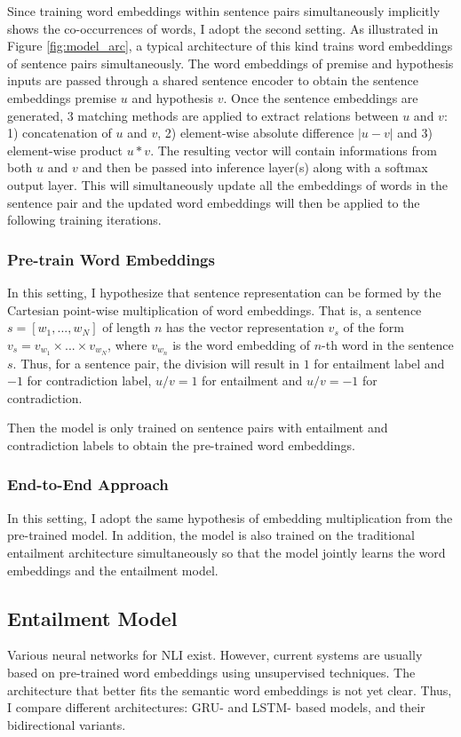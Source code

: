 \documentclass[10pt,twocolumn,letterpaper]{article}
\begin{document}
Since training word embeddings within sentence pairs simultaneously implicitly shows the co-occurrences of words, I adopt the second setting. As illustrated in Figure \ref{fig:model_arc}, a typical architecture of this kind trains word embeddings of sentence pairs simultaneously. The word embeddings of premise and hypothesis inputs are passed through a shared sentence encoder to obtain the sentence embeddings premise $u$ and hypothesis $v$. Once the sentence embeddings are generated, 3 matching methods are applied to extract relations between $u$ and $v$: 1) concatenation of $u$ and $v$, 2) element-wise absolute difference $|u - v|$ and 3) element-wise product $u*v$. The resulting vector will contain informations from both $u$ and $v$ and then be passed into inference layer(s) along with a softmax output layer. This will simultaneously update all the embeddings of words in the sentence pair and the updated word embeddings will then be applied to the following training iterations.

\subsubsection{Pre-train Word Embeddings}
In this setting, I hypothesize that sentence representation can be formed by the Cartesian point-wise multiplication of word embeddings. That is, a sentence $s = [w_1, ..., w_N]$ of length $n$ has the vector representation $v_s$ of the form $v_s = v_{w_1} \times ... \times v_{w_N}$, where $v_{w_n}$ is the word embedding of $n$-th word in the sentence $s$. Thus, for a sentence pair, the division will result in $1$ for entailment label and $-1$ for contradiction label, \ie $u / v = 1$ for entailment and $u / v = -1$ for contradiction.

Then the model is only trained on sentence pairs with entailment and contradiction labels to obtain the pre-trained word embeddings.

\subsubsection{End-to-End Approach}
In this setting, I adopt the same hypothesis of embedding multiplication from the pre-trained model. In addition, the model is also trained on the traditional entailment architecture simultaneously so that the model jointly learns the word embeddings and the entailment model.

\subsection{Entailment Model}
Various neural networks for NLI exist. However, current systems are usually based on pre-trained word embeddings using unsupervised techniques. The architecture that better fits the semantic word embeddings is not yet clear. Thus, I compare different architectures: GRU- and LSTM- based models, and their bidirectional variants.
\end{document}
